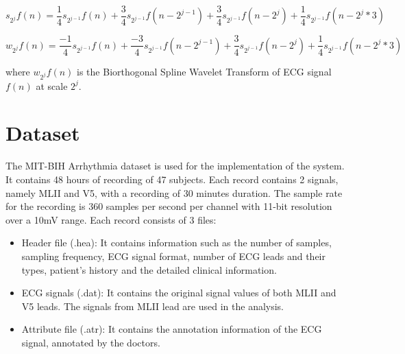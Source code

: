 \begin{equation} \label{eqn:approx}
{ s_{2^j}f(n) = \frac{1}{4}s_{2^{j-1}}f(n) + \frac{3}{4}s_{2^{j-1}}f(n-2^{j-1}) + \frac{3}{4}s_{2^{j-1}}f(n-2^{j}) + \frac{1}{4}s_{2^{j-1}}f(n-2^{j} * 3) }
\end{equation}

\begin{equation} \label{eqn:detail}
{ w_{2^j}f(n) = \frac{-1}{4}s_{2^{j-1}}f(n) + \frac{-3}{4}s_{2^{j-1}}f(n-2^{j-1}) + \frac{3}{4}s_{2^{j-1}}f(n-2^{j}) + \frac{1}{4}s_{2^{j-1}}f(n-2^{j} * 3) }
\end{equation}

where $w_{2^j}f(n)$ is the Biorthogonal Spline Wavelet Transform of ECG signal $f(n)$ at scale $2^j$.


\section{Dataset}

The MIT-BIH Arrhythmia dataset is used for the implementation of the system. It contains 48 hours of recording of 47 subjects. Each record contains 2 signals, namely MLII and V5, with a recording of 30 minutes duration. The sample rate for the recording is 360 samples per second per channel with 11-bit resolution over a 10mV range. Each record consists of 3 files:

\begin{itemize}
	\item Header file (.hea): It contains information such as the number of samples, sampling frequency, ECG signal format, number of ECG leads and their types, patient's history and the detailed clinical information.
	
	\item ECG signals (.dat): It contains the original signal values of both MLII and V5 leads. The signals from MLII lead are used in the analysis.
	
	\item Attribute file (.atr): It contains the annotation information of the ECG signal, annotated by the doctors.
\end{itemize}


